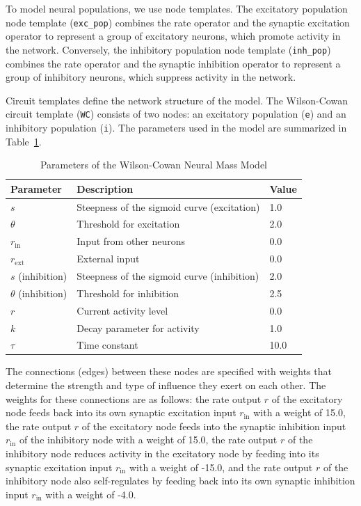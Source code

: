 \documentclass[12pt]{article}
\begin{document}
To model neural populations, we use node templates. The excitatory population node template (\texttt{exc\_pop}) combines the rate operator and the synaptic excitation operator to represent a group of excitatory neurons, which promote activity in the network. Conversely, the inhibitory population node template (\texttt{inh\_pop}) combines the rate operator and the synaptic inhibition operator to represent a group of inhibitory neurons, which suppress activity in the network.

Circuit templates define the network structure of the model. The Wilson-Cowan circuit template (\texttt{WC}) consists of two nodes: an excitatory population (\texttt{e}) and an inhibitory population (\texttt{i}). The parameters used in the model are summarized in Table~\ref{tab:parameters}.

\begin{table}[h]
    \centering
    \caption{Parameters of the Wilson-Cowan Neural Mass Model}
    \label{tab:parameters}
    \begin{tabular}{@{}lll@{}}
        \toprule
        \textbf{Parameter} & \textbf{Description} & \textbf{Value} \\ \midrule
        \( s \) & Steepness of the sigmoid curve (excitation) & 1.0 \\
        \( \theta \) & Threshold for excitation & 2.0 \\
        \( r_{\mathrm{in}} \) & Input from other neurons & 0.0 \\
        \( r_{\mathrm{ext}} \) & External input & 0.0 \\
        \( s \) (inhibition) & Steepness of the sigmoid curve (inhibition) & 2.0 \\
        \( \theta \) (inhibition) & Threshold for inhibition & 2.5 \\
        \( r \) & Current activity level & 0.0 \\
        \( k \) & Decay parameter for activity & 1.0 \\
        \( \tau \) & Time constant & 10.0 \\ \bottomrule
    \end{tabular}
\end{table}

The connections (edges) between these nodes are specified with weights that determine the strength and type of influence they exert on each other. The weights for these connections are as follows: the rate output \( r \) of the excitatory node feeds back into its own synaptic excitation input \( r_{\mathrm{in}} \) with a weight of 15.0, the rate output \( r \) of the excitatory node feeds into the synaptic inhibition input \( r_{\mathrm{in}} \) of the inhibitory node with a weight of 15.0, the rate output \( r \) of the inhibitory node reduces activity in the excitatory node by feeding into its synaptic excitation input \( r_{\mathrm{in}} \) with a weight of -15.0, and the rate output \( r \) of the inhibitory node also self-regulates by feeding back into its own synaptic inhibition input \( r_{\mathrm{in}} \) with a weight of -4.0.
\end{document}
